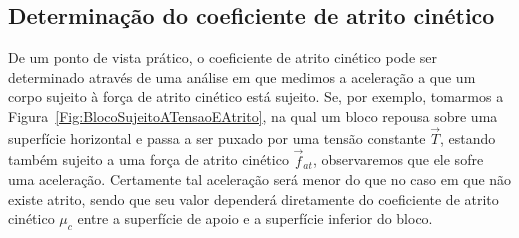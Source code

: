 \subsection{Determinação do coeficiente de atrito cinético}
\label{Sec:AtritoCinetico}

De um ponto de vista prático, o coeficiente de atrito cinético pode ser determinado através de uma análise em que medimos a aceleração a que um corpo sujeito à força de atrito cinético está sujeito. Se, por exemplo, tomarmos a Figura~\ref{Fig:BlocoSujeitoATensaoEAtrito}, na qual um bloco repousa sobre uma superfície horizontal e passa a ser puxado por uma tensão constante $\vec{T}$, estando também sujeito a uma força de atrito cinético $\vec{f}_{at}$, observaremos que ele sofre uma aceleração. Certamente tal aceleração será menor do que no caso em que não existe atrito, sendo que seu valor dependerá diretamente do coeficiente de atrito cinético $\mu_c$ entre a superfície de apoio e a superfície inferior do bloco.

